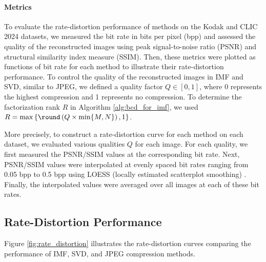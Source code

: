 \paragraph{Metrics}
To evaluate the rate-distortion performance of methods on the Kodak and CLIC 2024 datasets, we measured the bit rate in bits per pixel (bpp) and assessed the quality of the reconstructed images using peak signal-to-noise ratio (PSNR) and structural similarity index measure (SSIM). Then, these metrics were plotted as functions of bit rate for each method to illustrate their rate-distortion performance. To control the quality of the reconstructed images in IMF and SVD, similar to JPEG, we defined a quality factor $Q\in[0,1]$, where 0 represents the highest compression and 1 represents no compression. To determine the factorization rank $R$ in Algorithm \ref{alg:bcd_for_imf}, we used $R = \max\left\{\round\left(Q \times \min\{M,N\}\right), 1\right\}$.

More precisely, to construct a rate-distortion curve for each method on each dataset, we evaluated various qualities $Q$ for each image. For each quality, we first measured the PSNR/SSIM values at the corresponding bit rate. Next, PSNR/SSIM values were interpolated at evenly spaced bit rates ranging from 0.05 bpp to 0.5 bpp using LOESS (locally estimated scatterplot smoothing) \cite{cleveland1988locally}. Finally, the interpolated values were averaged over all images at each of these bit rates.


\subsection{Rate-Distortion Performance} \label{sec:rate_distortion_performance}

Figure \ref{fig:rate_distortion} illustrates the rate-distortion curves comparing the performance of IMF, SVD, and JPEG compression methods.

